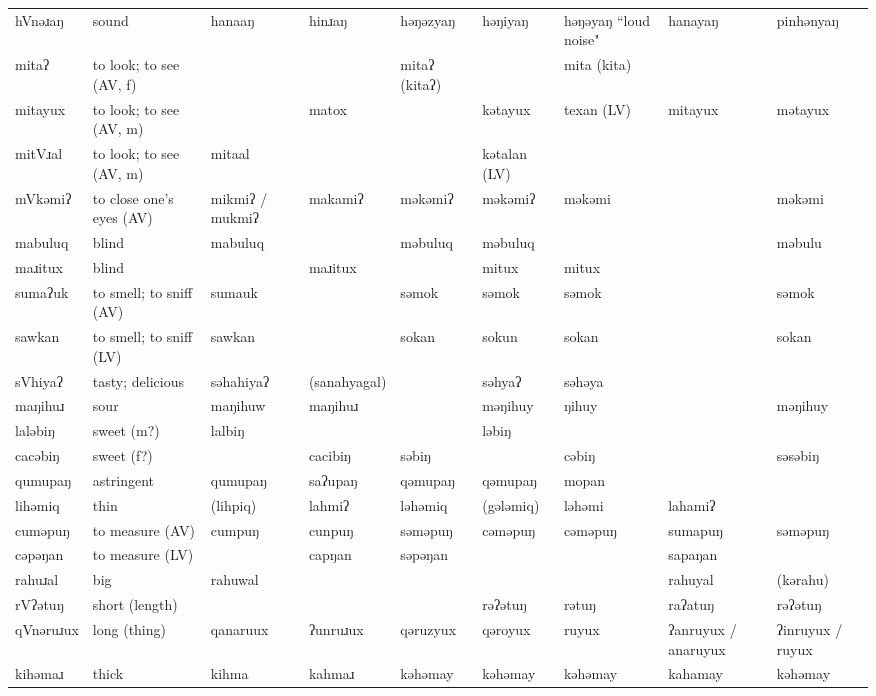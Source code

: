 \begin{landscape}
\begin{longtable}{*{9}{>{\raggedright\arraybackslash}p{}}}
\text{*}hVnəɹaŋ & sound & hanaaŋ & hinɹaŋ & həŋəzyaŋ & həŋiyaŋ & həŋəyaŋ ``loud noise" & hanayaŋ & pinhənyaŋ\\
\text{*}mitaʔ & to look; to see (AV, f) &  &  & mitaʔ (kitaʔ) &  & mita (kita) &  & \\
\text{*}mitayux & to look; to see (AV, m) &  & matox &  & kətayux & texan (LV) & mitayux & mətayux\\
\text{*}mitVɹal & to look; to see (AV, m) & mitaal &  &  & kətalan (LV) &  &  & \\
\text{*}mVkəmiʔ & to close one's eyes (AV) & mikmiʔ / mukmiʔ & makamiʔ & məkəmiʔ & məkəmiʔ & məkəmi &  & məkəmi\\
\text{*}mabuluq & blind & mabuluq &  & məbuluq & məbuluq &  &  & məbulu\\
\text{*}maɹitux & blind &  & maɹitux &  & mitux & mitux &  & \\
\text{*}sumaʔuk & to smell; to sniff (AV) & sumauk &  & səmok & səmok & səmok &  & səmok\\
\text{*}sawkan & to smell; to sniff (LV) & sawkan &  & sokan & sokun & sokan &  & sokan\\
\text{*}sVhiyaʔ & tasty; delicious & səhahiyaʔ & (sanahyagal) &  & səhyaʔ & səhəya &  & \\
\text{*}maŋihuɹ & sour & maŋihuw & maŋihuɹ &  & məŋihuy & ŋihuy &  & məŋihuy\\
\text{*}laləbiŋ & sweet (m?) & lalbiŋ &  &  & ləbiŋ &  &  & \\
\text{*}cacəbiŋ & sweet (f?) &  & cacibiŋ & səbiŋ &  & cəbiŋ &  & səsəbiŋ\\
\text{*}qumupaŋ & astringent & qumupaŋ & saʔupaŋ & qəmupaŋ & qəmupaŋ & mopan &  & \\
\text{*}lihəmiq & thin & (lihpiq) & lahmiʔ & ləhəmiq & (gələmiq) & ləhəmi & lahamiʔ & \\
\text{*}cuməpuŋ & to measure (AV) & cumpuŋ & cunpuŋ & səməpuŋ & cəməpuŋ & cəməpuŋ & sumapuŋ & səməpuŋ\\
\text{*}cəpəŋan & to measure (LV) &  & capŋan & səpəŋan &  &  & sapaŋan & \\
\text{*}rahuɹal & big & rahuwal &  &  &  &  & rahuyal & (kərahu)\\
\text{*}rVʔətuŋ & short (length) &  &  &  & rəʔətuŋ & rətuŋ & raʔatuŋ & rəʔətuŋ\\
\text{*}qVnəruɹux & long (thing) & qanaruux & ʔunruɹux & qəruzyux & qəroyux & ruyux & ʔanruyux / anaruyux & ʔinruyux / ruyux\\
\text{*}kihəmaɹ & thick & kihma & kahmaɹ & kəhəmay & kəhəmay & kəhəmay & kahamay & kəhəmay\\

\end{longtable}
\end{landscape}
